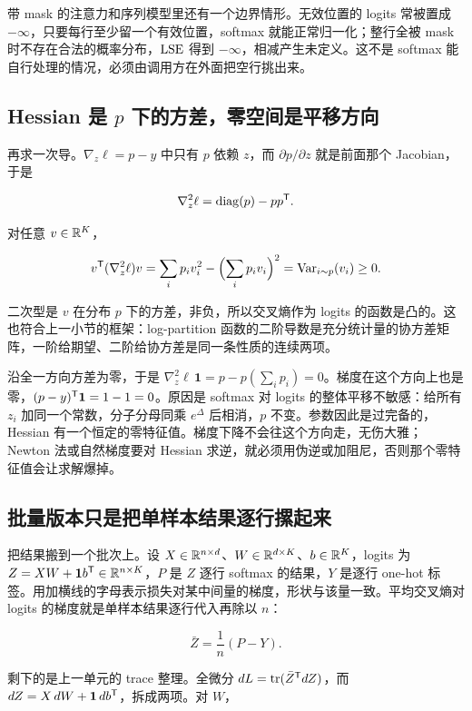带 mask 的注意力和序列模型里还有一个边界情形。无效位置的 logits 常被置成 \(-\infty\)，只要每行至少留一个有效位置，softmax 就能正常归一化；整行全被 mask 时不存在合法的概率分布，\(\operatorname{LSE}\) 得到 \(-\infty\)，相减产生未定义。这不是 softmax 能自行处理的情况，必须由调用方在外面把空行挑出来。

\subsection{Hessian 是 \texorpdfstring{\(p\)}{p} 下的方差，零空间是平移方向}

再求一次导。\(\nabla_z\ell=p-y\) 中只有 \(p\) 依赖 \(z\)，而 \(\partial p/\partial z\) 就是前面那个 Jacobian，于是

\[
\nabla_z^2\ell=\operatorname{diag}(p)-pp^{\mathsf{T}}.
\]

对任意 \(v\in\mathbb{R}^K\)，

\[
v^{\mathsf{T}}(\nabla_z^2\ell)v=\sum_ip_iv_i^2-\Bigl(\sum_ip_iv_i\Bigr)^2=\operatorname{Var}_{i\sim p}(v_i)\ge0.
\]

二次型是 \(v\) 在分布 \(p\) 下的方差，非负，所以交叉熵作为 logits 的函数是凸的。这也符合上一小节的框架：log-partition 函数的二阶导数是充分统计量的协方差矩阵，一阶给期望、二阶给协方差是同一条性质的连续两项。

沿全一方向方差为零，于是 \(\nabla_z^2\ell\,\mathbf1=p-p(\sum_ip_i)=0\)。梯度在这个方向上也是零，\((p-y)^{\mathsf{T}}\mathbf1=1-1=0\)。原因是 softmax 对 logits 的整体平移不敏感：给所有 \(z_i\) 加同一个常数，分子分母同乘 \(e^\Delta\) 后相消，\(p\) 不变。参数因此是过完备的，Hessian 有一个恒定的零特征值。梯度下降不会往这个方向走，无伤大雅；Newton 法或自然梯度要对 Hessian 求逆，就必须用伪逆或加阻尼，否则那个零特征值会让求解爆掉。

\subsection{批量版本只是把单样本结果逐行摞起来}

把结果搬到一个批次上。设 \(X\in\mathbb{R}^{n\times d}\)、\(W\in\mathbb{R}^{d\times K}\)、\(b\in\mathbb{R}^K\)，logits 为 \(Z=XW+\mathbf1b^{\mathsf{T}}\in\mathbb{R}^{n\times K}\)，\(P\) 是 \(Z\) 逐行 softmax 的结果，\(Y\) 是逐行 one-hot 标签。用加横线的字母表示损失对某中间量的梯度，形状与该量一致。平均交叉熵对 logits 的梯度就是单样本结果逐行代入再除以 \(n\)：

\[
\bar Z=\frac1n(P-Y).
\]

剩下的是上一单元的 trace 整理。全微分 \(dL=\operatorname{tr}(\bar Z^{\mathsf{T}}dZ)\)，而 \(dZ=X\,dW+\mathbf1\,db^{\mathsf{T}}\)，拆成两项。对 \(W\)，

